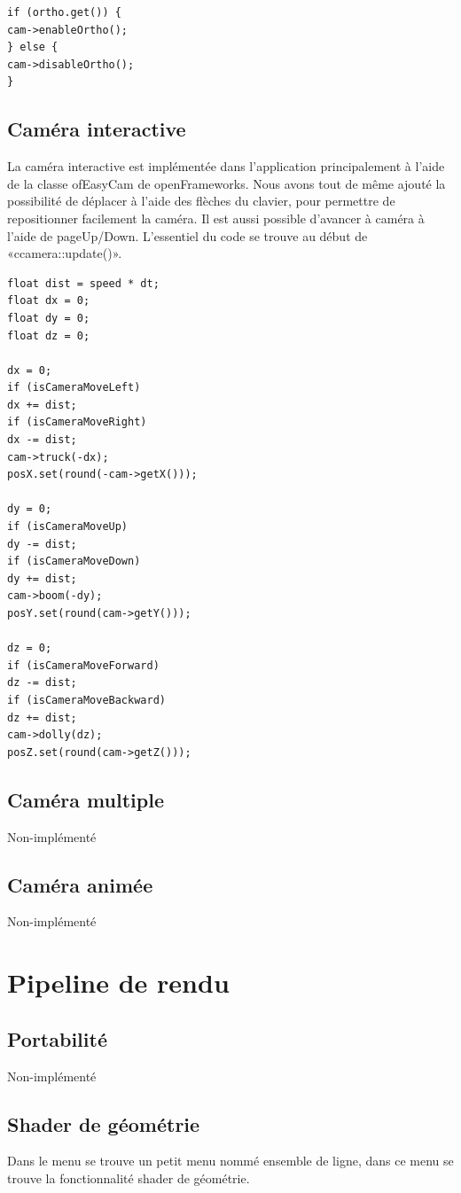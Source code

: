 \begin{lstlisting}
if (ortho.get()) {
cam->enableOrtho();
} else {
cam->disableOrtho();
}
\end{lstlisting}

\subsection{Caméra interactive}
La caméra interactive est implémentée dans l'application principalement à l'aide de la classe ofEasyCam de openFrameworks. Nous avons tout de même ajouté la possibilité de déplacer à l'aide des flèches du clavier, pour permettre de repositionner facilement la caméra. Il est aussi possible d'avancer à caméra à l'aide de pageUp/Down. L'essentiel du code se trouve au début de «ccamera::update()».

\begin{lstlisting}
float dist = speed * dt;
float dx = 0;
float dy = 0;
float dz = 0;

dx = 0;
if (isCameraMoveLeft)
dx += dist;
if (isCameraMoveRight)
dx -= dist;
cam->truck(-dx);
posX.set(round(-cam->getX()));

dy = 0;
if (isCameraMoveUp)
dy -= dist;
if (isCameraMoveDown)
dy += dist;
cam->boom(-dy);
posY.set(round(cam->getY()));

dz = 0;
if (isCameraMoveForward)
dz -= dist;
if (isCameraMoveBackward)
dz += dist;
cam->dolly(dz);
posZ.set(round(cam->getZ()));
\end{lstlisting}

\subsection{Caméra multiple}
Non-implémenté

\subsection{Caméra animée}
Non-implémenté


\pagebreak
\section{Pipeline de rendu}
\subsection{Portabilité}
Non-implémenté

\subsection{Shader de géométrie}
Dans le menu se trouve un petit menu nommé ensemble de ligne, dans ce menu se trouve la fonctionnalité shader de géométrie. 

